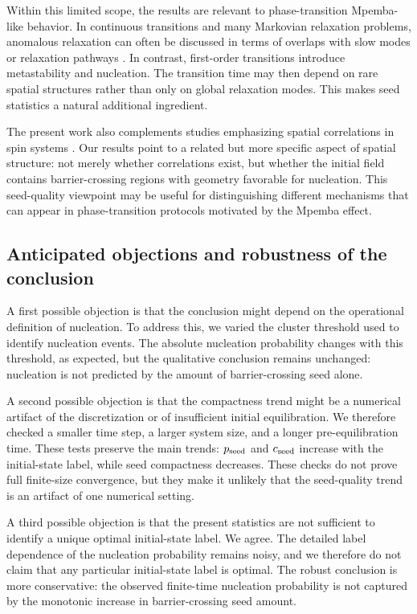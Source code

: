 ﻿\documentclass[aps,pre,preprint,showkeys,amsmath,amssymb,superscriptaddress,longbibliography]{revtex4-2}
\begin{document}
Within this limited scope, the results are relevant to phase-transition Mpemba-like behavior. In continuous transitions and many Markovian relaxation problems, anomalous relaxation can often be discussed in terms of overlaps with slow modes or relaxation pathways \cite{LuRaz2017,Klich2019,Holtzman2022}. In contrast, first-order transitions introduce metastability and nucleation. The transition time may then depend on rare spatial structures rather than only on global relaxation modes. This makes seed statistics a natural additional ingredient.

The present work also complements studies emphasizing spatial correlations in spin systems \cite{Vadakkayil2021,Chatterjee2024}. Our results point to a related but more specific aspect of spatial structure: not merely whether correlations exist, but whether the initial field contains barrier-crossing regions with geometry favorable for nucleation. This seed-quality viewpoint may be useful for distinguishing different mechanisms that can appear in phase-transition protocols motivated by the Mpemba effect.

\subsection{Anticipated objections and robustness of the conclusion}\label{anticipated-objections-and-robustness-of-the-conclusion}

A first possible objection is that the conclusion might depend on the operational definition of nucleation. To address this, we varied the cluster threshold used to identify nucleation events. The absolute nucleation probability changes with this threshold, as expected, but the qualitative conclusion remains unchanged: nucleation is not predicted by the amount of barrier-crossing seed alone.

A second possible objection is that the compactness trend might be a numerical artifact of the discretization or of insufficient initial equilibration. We therefore checked a smaller time step, a larger system size, and a longer pre-equilibration time. These tests preserve the main trends: $p_{\rm seed}$ and $c_{\rm seed}$ increase with the initial-state label, while seed compactness decreases. These checks do not prove full finite-size convergence, but they make it unlikely that the seed-quality trend is an artifact of one numerical setting.

A third possible objection is that the present statistics are not sufficient to identify a unique optimal initial-state label. We agree. The detailed label dependence of the nucleation probability remains noisy, and we therefore do not claim that any particular initial-state label is optimal. The robust conclusion is more conservative: the observed finite-time nucleation probability is not captured by the monotonic increase in barrier-crossing seed amount.
\end{document}
